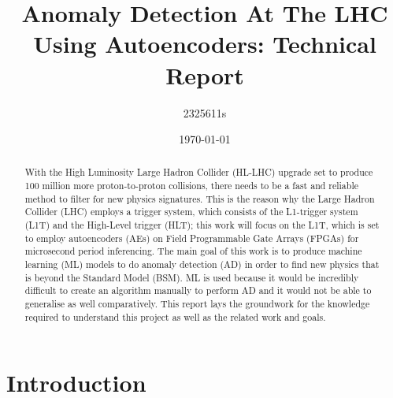 \documentclass[a4paper]{article}
\title{Anomaly Detection At The LHC Using Autoencoders: Technical Report}
\author{2325611s}
\date{
\today
}
\theoremstyle{plain}
\theoremstyle{definition}
\begin{document}
	\maketitle
	
	\vspace{20mm}
	\begin{abstract}
		
		With the High Luminosity Large Hadron Collider (HL-LHC) upgrade set to produce 100 million more proton-to-proton collisions, there needs to be a fast and reliable method to filter for new physics signatures. This is the reason why the Large Hadron Collider (LHC) employs a trigger system, which consists of the L1-trigger system (L1T) and the High-Level trigger (HLT); this work will focus on the L1T, which is set to employ autoencoders (AEs) on Field Programmable Gate Arrays (FPGAs) for microsecond period inferencing. The main goal of this work is to produce machine learning (ML) models to do anomaly detection (AD) in order to find new physics that is beyond the Standard Model (BSM). ML is used because it would be incredibly difficult to create an algorithm manually to perform AD and it would not be able to generalise as well comparatively. This report lays the groundwork for the knowledge required to understand this project as well as the related work and goals. 
		
	\end{abstract}

	
	\clearpage

	\tableofcontents
	
	\clearpage
	
	\section{Introduction}
	\label{sec:intro}
    
\end{document}
